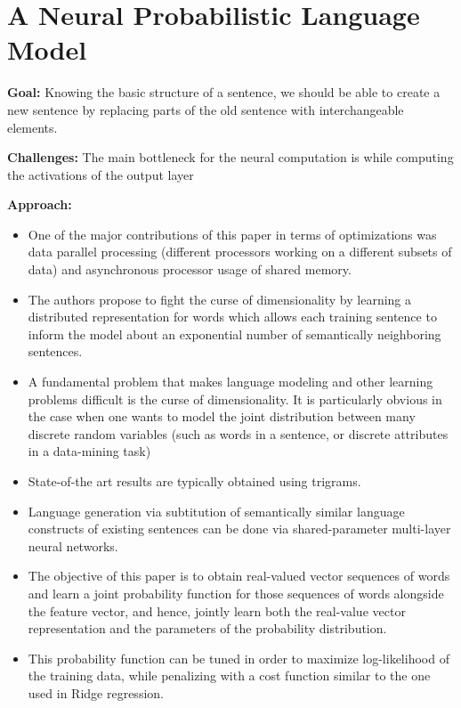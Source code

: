 \documentclass[11pt,a4paper]{article}
\begin{document}


\section{A Neural Probabilistic Language Model} %
\label{sec:a_neural_probabilistic_language_model}

  \textbf{Goal:}
  Knowing the basic structure of a sentence, we should be able to create a new sentence by replacing parts of the old sentence with interchangeable elements.

  \textbf{Challenges:}
  The main bottleneck for the neural computation is while computing the activations of the output layer

  \textbf{Approach:}
  \begin{itemize}
    \item 
    One of the major contributions of this paper in terms of optimizations was data parallel processing (different processors working on a different subsets of data) and asynchronous processor usage of shared memory.
    \item 
    The authors propose to fight the curse of dimensionality by learning a distributed representation for words which allows each training sentence to inform the model about an exponential number of semantically neighboring sentences.
    \item 
    A fundamental problem that makes language modeling and other learning problems difficult is the curse of dimensionality. It is particularly obvious in the case when one wants to model the joint distribution between many discrete random variables (such as words in a sentence, or discrete attributes in a data-mining task)
    \item 
    State-of-the art results are typically obtained using trigrams.
    \item 
    Language generation via subtitution of semantically similar language constructs of existing sentences can be done via shared-parameter multi-layer neural networks.
    \item 
    The objective of this paper is to obtain real-valued vector sequences of words and learn a joint probability function for those sequences of words alongside the feature vector, and hence, jointly learn both the real-value vector representation and the parameters of the probability distribution.
    \item 
    This probability function can be tuned in order to maximize log-likelihood of the training data, while penalizing with a cost function similar to the one used in Ridge regression.

\end{itemize}
\end{document}
